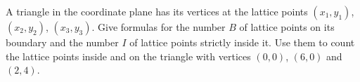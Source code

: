 A triangle in the coordinate plane has its vertices at the lattice points $(x_1,y_1)$, $(x_2,y_2)$, $(x_3,y_3)$. Give formulas for the number $B$ of lattice points on its boundary and the number $I$ of lattice points strictly inside it. Use them to count the lattice points inside and on the triangle with vertices $(0,0)$, $(6,0)$ and $(2,4)$.
